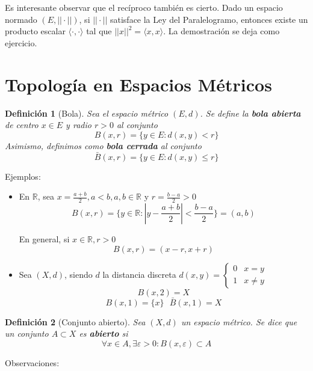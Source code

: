 \documentclass[10pt,a4paper,openright]{book}
\theoremstyle{break}
\newtheorem*{defi}{Definición}
\begin{document}
Es interesante observar que el recíproco también es cierto. Dado un espacio normado $(E, || \cdot ||)$, si $|| \cdot ||$ satisface la Ley del Paralelogramo, entonces existe un producto escalar $\langle \cdot , \cdot \rangle$ tal que $||x||^2 = \langle x,x\rangle$. La demostración se deja como ejercicio.

\section*{Topología en Espacios Métricos}

\begin{defi}[Bola]

Sea el espacio métrico $(E,d)$. Se define la \textbf{bola abierta} de centro $x\in E$ y radio $r>0$ al conjunto 
$$B(x,r) = \{y \in E : d(x,y) < r\}$$
Asimismo, definimos como \textbf{bola cerrada} al conjunto
$$\bar{B}(x,r) = \{y \in E : d(x,y) \leq r\}$$
\end{defi}

Ejemplos:
\begin{itemize}
\item En $\mathbb{R}$, sea $x = \frac{a+b}{2}, a < b, a,b \in \mathbb{R}$ y $r = \frac{b-a}{2} > 0$
$$B(x,r) = \{y \in \mathbb{R} : \left| y - \frac{a+b}{2}\right| < \frac{b-a}{2}\} = (a,b)$$

En general, si $x \in \mathbb{R}, r>0$
$$B(x,r) = (x-r,x+r)$$

\item Sea $(X,d)$, siendo $d$ la distancia discreta $d(x,y) = \begin{cases} 0 & x=y \\ 1 & x \neq y \end{cases}$
$$B(x,2) = X$$
$$B(x,1) = \{x\} \ \ \ \bar{B}(x,1) = X$$

\end{itemize}

\begin{defi}[Conjunto abierto]
Sea $(X,d)$ un espacio métrico. Se dice que un conjunto $A \subset X$ es \textbf{abierto} si 
$$\forall x \in A, \exists \varepsilon > 0 : B(x,\varepsilon) \subset A$$
\end{defi}

Observaciones:
\end{document}
